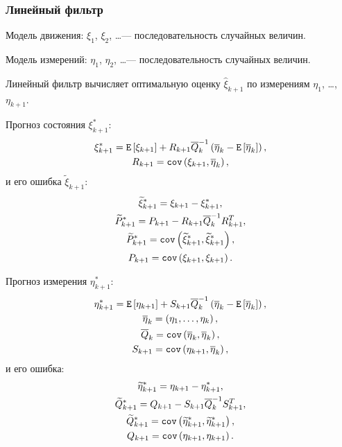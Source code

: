 \subsubsection{Линейный фильтр}

Модель движения: $\xi_1$, $\xi_2$, \dots --- последовательность случайных величин.

Модель измерений: $\eta_1$, $\eta_2$, \dots --- последовательность случайных величин.

Линейный фильтр вычисляет оптимальную оценку $\widehat{\xi}_{k+1}$ по измерениям $\eta_1$, \dots, $\eta_{k+1}$.

Прогноз состояния $\xi_{k+1}^*$:
\begin{gather*}
    \xi_{k+1}^* = \mathtt{E} \left[ \xi_{k+1} \right] + R_{k+1} \overline{Q}_k^{-1} \left ( \overline{\eta}_k - \mathtt{E} \left[ \overline{\eta}_k \right]\right ) , \\
    R_{k+1} = \mathtt{cov} \left( \xi_{k+1}, \overline{\eta}_k \right) ,
\end{gather*}
и его ошибка $\widetilde{\xi}_{k+1}$:
\begin{gather*}
    \widetilde{\xi}_{k+1}^* = \xi_{k+1} - \xi_{k+1}^* , \\
    \widetilde{P}_{k+1}^* = P_{k+1} - R_{k+1} \overline{Q}_k^{-1} R_{k+1}^T , \\
    \widetilde{P}_{k+1}^* = \mathtt{cov} \left( \widetilde{\xi}_{k+1}^*, \widetilde{\xi}_{k+1}^* \right) , \\
    P_{k+1} = \mathtt{cov} \left( \xi_{k+1}, \xi_{k+1} \right) .
\end{gather*}

Прогноз измерения $\eta_{k+1}^*$:
\begin{gather*}
    \eta_{k+1}^* = \mathtt{E} \left[ \eta_{k+1} \right] + S_{k+1} \overline{Q}_k^{-1} \left ( \overline{\eta}_k - \mathtt{E} \left[ \overline{\eta}_k \right] \right ) , \\
    \overline{\eta}_k = \left ( \eta_1, \dots, \eta_k \right ) , \\
    \overline{Q}_k = \mathtt{cov} \left( \overline{\eta}_k, \overline{\eta}_k \right) , \\
    S_{k+1} = \mathtt{cov} \left( \eta_{k+1}, \overline{\eta}_k \right) ,
\end{gather*}
и его ошибка:
\begin{gather*}
    \widetilde{\eta}_{k+1}^* = \eta_{k+1} - \eta_{k+1}^* , \\
    \widetilde{Q}_{k+1}^* = Q_{k+1} - S_{k+1} \overline{Q}_k^{-1} S_{k+1}^T , \\
    \widetilde{Q}_{k+1}^* = \mathtt{cov} \left( \widetilde{\eta}_{k+1}^*, \widetilde{\eta}_{k+1}^* \right) , \\
    Q_{k+1} = \mathtt{cov} \left( \eta_{k+1}, \eta_{k+1} \right) .
\end{gather*}

